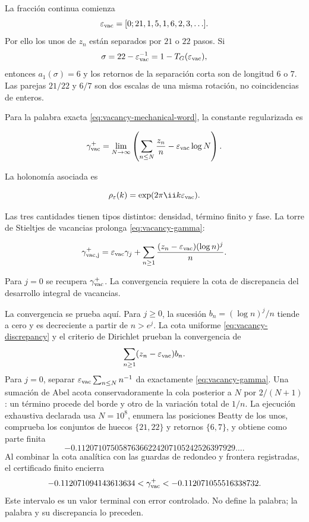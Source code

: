 La fracci\'on continua comienza
\[
\varepsilon_{\rm vac}
=[0;21,1,5,1,6,2,3,\ldots].
\]
Por ello los unos de \(z_n\) est\'an separados por \(21\) o \(22\) pasos.
Si
\[
\sigma=22-\varepsilon_{\rm vac}^{-1}
=1-T_G(\varepsilon_{\rm vac}),
\]
entonces \(a_1(\sigma)=6\) y los retornos de la separaci\'on corta son de
longitud \(6\) o \(7\). Las parejas \(21/22\) y \(6/7\) son dos escalas de
una misma rotaci\'on, no coincidencias de enteros.

Para la palabra exacta \cref{eq:vacancy-mechanical-word}, la constante regularizada es

\begin{equation}
\gamma_{\rm vac}^{+}
=\lim_{N\to\infty}\left(
\sum_{n\le N}\frac{z_n}{n}
-\varepsilon_{\rm vac}\log N
\right).
\label{eq:vacancy-gamma}
\end{equation}

La holonom\'ia asociada es

\begin{equation}
\rho_\varepsilon(k)=\exp(2\pi\ii k\varepsilon_{\rm vac}).
\label{eq:vacancy-holonomy}
\end{equation}

Las tres cantidades tienen tipos distintos: densidad, t\'ermino finito y fase. La torre de Stieltjes de vacancias prolonga \cref{eq:vacancy-gamma}:

\begin{equation}
\gamma_{\rm vac,j}^{+}
=\varepsilon_{\rm vac}\gamma_j
+\sum_{n\ge1}\frac{(z_n-\varepsilon_{\rm vac})(\log n)^j}{n}.
\label{eq:vacancy-stieltjes}
\end{equation}

Para \(j=0\) se recupera \(\gamma_{\rm vac}^{+}\). La convergencia requiere la cota de discrepancia del desarrollo integral de vacancias.

La convergencia se prueba aqu\'i. Para \(j\ge0\), la sucesi\'on
\(b_n=(\log n)^j/n\) tiende a cero y es decreciente a partir de
\(n>e^j\). La cota uniforme \cref{eq:vacancy-discrepancy} y el criterio de
Dirichlet prueban la convergencia de
\[
\sum_{n\ge1}(z_n-\varepsilon_{\rm vac})b_n.
\]
Para \(j=0\), separar
\(\varepsilon_{\rm vac}\sum_{n\le N}n^{-1}\) da exactamente
\cref{eq:vacancy-gamma}. Una sumaci\'on de Abel acota conservadoramente la
cola posterior a \(N\) por \(2/(N+1)\): un t\'ermino procede del borde y
otro de la variaci\'on total de \(1/n\). La ejecuci\'on exhaustiva declarada usa
\(N=10^8\), enumera las posiciones Beatty de los unos, comprueba los
conjuntos de huecos \(\{21,22\}\) y retornos \(\{6,7\}\), y obtiene como
parte finita
\[
-0.11207107505876366224207105242526397929\ldots.
\]
Al combinar la cota anal\'itica con las guardas de redondeo y frontera
registradas, el certificado finito encierra
\begin{equation}
-0.112071094143613634
<\gamma_{\rm vac}^{+}
<-0.112071055516338732.
\label{eq:vacancy-gamma-interval}
\end{equation}
Este intervalo es un valor terminal con error controlado. No define la
palabra; la palabra y su discrepancia lo preceden.

